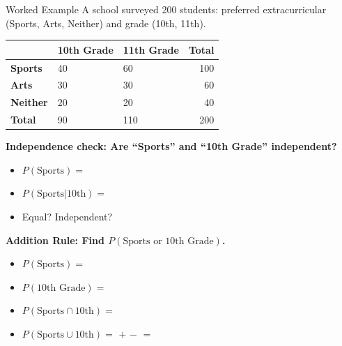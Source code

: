 \documentclass[10pt]{article}
\begin{document}
\vspace{0.1in}

\begin{notesbox}{Worked Example}
\small
A school surveyed 200 students: preferred extracurricular (Sports, Arts, Neither) and grade (10th, 11th).

\vspace{4pt}
\renewcommand{\arraystretch}{1.4}
\begin{tabularx}{\linewidth}{@{} l X X r @{}}
 & \textbf{10th Grade} & \textbf{11th Grade} & \textbf{Total} \\
\hline
\textbf{Sports} & 40 & 60 & 100 \\
\textbf{Arts}   & 30 & 30 & 60  \\
\textbf{Neither}& 20 & 20 & 40  \\
\hline
\textbf{Total}  & 90 & 110 & 200 \\
\end{tabularx}

\vspace{8pt}
\textbf{Independence check: Are ``Sports'' and ``10th Grade'' independent?}
\begin{itemize}[itemsep=3pt]
  \item $P(\text{Sports}) = $ \blank{3cm}
  \item $P(\text{Sports}|\text{10th}) = $ \blank{3cm}
  \item Equal? \blank{2cm} \quad Independent? \blank{2cm}
\end{itemize}

\vspace{8pt}
\textbf{Addition Rule: Find $P(\text{Sports or 10th Grade})$.}
\begin{itemize}[itemsep=3pt]
  \item $P(\text{Sports}) = $ \blank{3cm}
  \item $P(\text{10th Grade}) = $ \blank{3cm}
  \item $P(\text{Sports} \cap \text{10th}) = $ \blank{3cm}
  \item $P(\text{Sports} \cup \text{10th}) = $ \blank{3cm} $+$ \blank{3cm} $-$ \blank{3cm} $=$ \blank{3cm}
\end{itemize}
\end{notesbox}

\vspace{0.1in}
\end{document}
